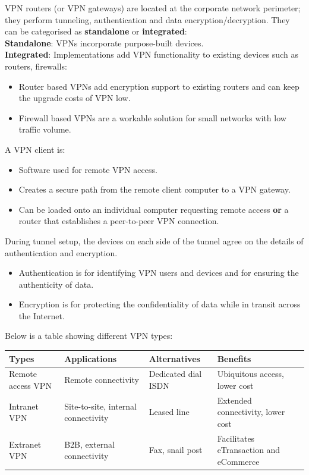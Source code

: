 \documentclass{article}
\begin{document}
VPN routers (or VPN gateways) are located at the corporate network perimeter; they perform tunneling, authentication and data encryption/decryption. They can be categorised as \textbf{standalone} or \textbf{integrated}:\\
\textbf{Standalone}: VPNs incorporate purpose-built devices.\\
\textbf{Integrated}: Implementations add VPN functionality to existing devices such as routers, firewalls:
\begin{itemize}
  \item Router based VPNs add encryption support to existing routers and can keep the upgrade costs of VPN low.
  \item Firewall based VPNs are a workable solution for small networks with low traffic volume.
\end{itemize}
A VPN client is:
\begin{itemize}
  \item Software used for remote VPN access.
  \item Creates a secure path from the remote client computer to a VPN gateway.
  \item Can be loaded onto an individual computer requesting remote access \textbf{or} a router that establishes a peer-to-peer VPN connection.
\end{itemize}
During tunnel setup, the devices on each side of the tunnel agree on the details of authentication and encryption.
\begin{itemize}
  \item Authentication is for identifying VPN users and devices and for ensuring the authenticity of data.
  \item Encryption is for protecting the confidentiality of data while in transit across the Internet.
\end{itemize}
Below is a table showing different VPN types:
\begin{center}
  \begin{tabular}{|p{2.5cm}|p{3cm}|p{2.5cm}|p{3cm}|}
    \hline
    Types & Applications & Alternatives & Benefits \\ \hline
    Remote access VPN & Remote connectivity & Dedicated dial ISDN & Ubiquitous access, lower cost \\ \hline
    Intranet VPN & Site-to-site, internal connectivity & Leased line & Extended connectivity, lower cost \\ \hline
    Extranet VPN & B2B, external connectivity & Fax, snail post & Facilitates eTransaction and eCommerce \\
    \hline
  \end{tabular}
\end{center}
\end{document}
